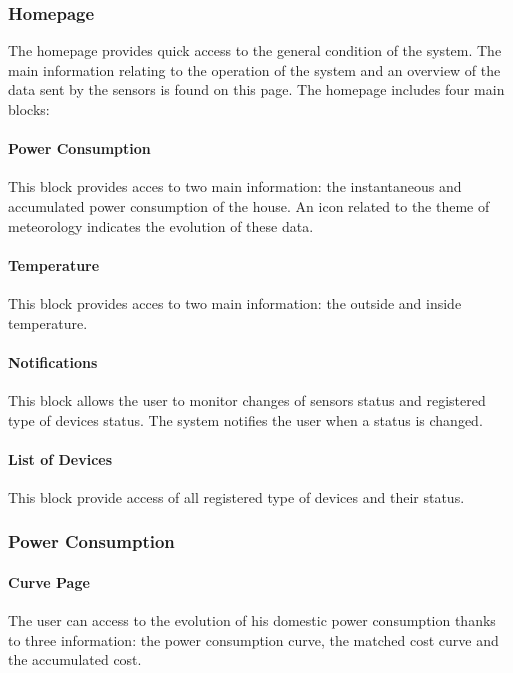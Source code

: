      
\subsubsection{Homepage}

The homepage provides quick access to the general condition of the system.
The main information relating to the operation of the system and an overview of the data sent by the sensors is found on this page.
The homepage includes four main blocks:%
    \paragraph{Power Consumption} 
    This block provides acces to two main information: the instantaneous and accumulated power consumption of the house. An icon related to the theme of meteorology indicates the evolution of these data. %
    \paragraph{Temperature}
    This block provides acces to two main information: the outside and inside temperature. 
    \paragraph{Notifications}
    This block allows the user to monitor changes of sensors status and registered type of devices status. The system notifies the user when a status is changed.
    \paragraph{List of Devices} %
    This block provide access of all registered type of devices and their status.

\subsubsection{Power Consumption}

    \paragraph{Curve Page}
    The user can access to the evolution of his domestic power consumption thanks to three information: the power consumption curve, the matched cost curve and the accumulated cost.
    
